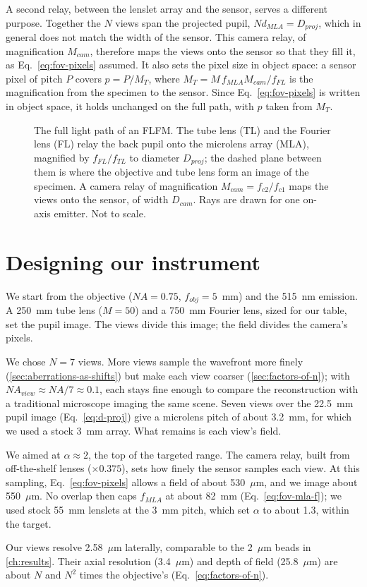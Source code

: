A second relay, between the lenslet array and the sensor, serves a different purpose. Together the $N$ views span the projected pupil, $N d_{MLA}=D_{proj}$, which in general does not match the width of the sensor. This camera relay, of magnification $M_{cam}$, therefore maps the views onto the sensor so that they fill it, as Eq.~\eqref{eq:fov-pixels} assumed. It also sets the pixel size in object space: a sensor pixel of pitch $P$ covers $p=P/M_T$, where $M_T=M\,f_{MLA}M_{cam}/f_{FL}$ is the magnification from the specimen to the sensor. Since Eq.~\eqref{eq:fov-pixels} is written in object space, it holds unchanged on the full path, with $p$ taken from $M_T$.

\begin{figure}[tbp]
    \centering
    \resizebox{\textwidth}{!}{}
    \caption{The full light path of an FLFM. The tube lens (TL) and the Fourier lens (FL) relay the back pupil onto the microlens array (MLA), magnified by $f_{FL}/f_{TL}$ to diameter $D_{proj}$; the dashed plane between them is where the objective and tube lens form an image of the specimen. A camera relay of magnification $M_{cam}=f_{c2}/f_{c1}$ maps the views onto the sensor, of width $D_{cam}$. Rays are drawn for one on-axis emitter. Not to scale.}
    \label{fig:flfm-full-path}
\end{figure}

\section{Designing our instrument}
\label{sec:design-parameters}

We start from the objective ($NA=0.75$, $f_{obj}=5$~mm) and the 515~nm emission. A 250~mm tube lens ($M=50$) and a 750~mm Fourier lens, sized for our table, set the pupil image. The views divide this image; the field divides the camera's pixels.

We chose $N=7$ views. More views sample the wavefront more finely (\cref{sec:aberrations-as-shifts}) but make each view coarser (\cref{sec:factors-of-n}); with $NA_{view}\approx NA/7\approx0.1$, each stays fine enough to compare the reconstruction with a traditional microscope imaging the same scene. Seven views over the 22.5~mm pupil image (Eq.~\eqref{eq:d-proj}) give a microlens pitch of about 3.2~mm, for which we used a stock 3~mm array. What remains is each view's field.

We aimed at $\alpha\approx2$, the top of the targeted range. The camera relay, built from off-the-shelf lenses ($\times0.375$), sets how finely the sensor samples each view. At this sampling, Eq.~\eqref{eq:fov-pixels} allows a field of about 530~$\mu$m, and we image about 550~$\mu$m. No overlap then caps $f_{MLA}$ at about 82~mm (Eq.~\eqref{eq:fov-mla-f}); we used stock 55~mm lenslets at the 3~mm pitch, which set $\alpha$ to about 1.3, within the target.

Our views resolve 2.58~$\mu$m laterally, comparable to the 2~$\mu$m beads in \cref{ch:results}. Their axial resolution (3.4~$\mu$m) and depth of field (25.8~$\mu$m) are about $N$ and $N^2$ times the objective's (Eq.~\eqref{eq:factors-of-n}).
